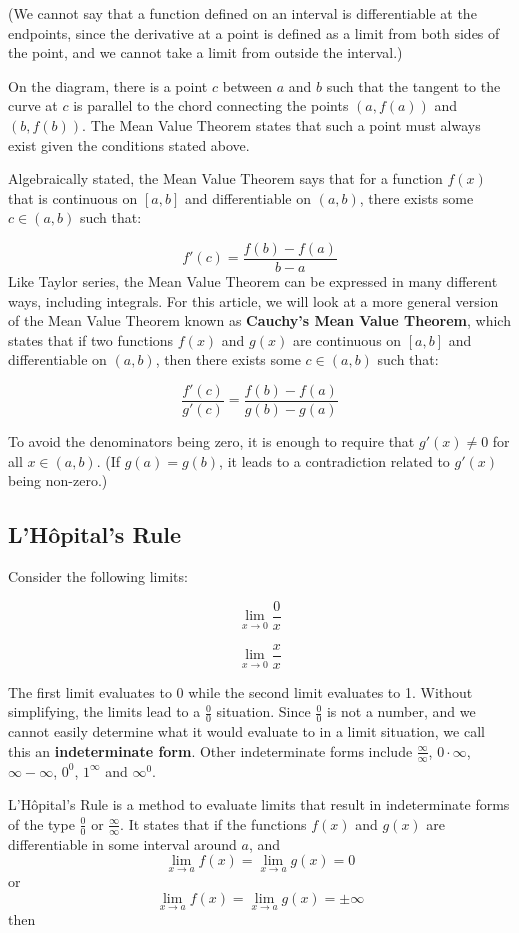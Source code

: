 \documentclass{article}
\begin{document}
(We cannot say that a function defined on an interval is differentiable at the endpoints, since the derivative at a point is defined as a limit from both sides of the point, and we cannot take a limit from outside the interval.)

On the diagram, there is a point $c$ between $a$ and $b$ such that the tangent to the curve at $c$ is parallel to the chord connecting the points $(a, f(a))$ and $(b, f(b))$. The Mean Value Theorem states that such a point must always exist given the conditions stated above.

Algebraically stated, the Mean Value Theorem says that for a function $f(x)$ that is continuous on $[a, b]$ and differentiable on $(a, b)$, there exists some $c \in (a, b)$ such that:

$$f'(c) = \frac{f(b) - f(a)}{b - a}$$
Like Taylor series, the Mean Value Theorem can be expressed in many different ways, including integrals. For this article, we will look at a more general version of the Mean Value Theorem known as \textbf{Cauchy's Mean Value Theorem}, which states that if two functions $f(x)$ and $g(x)$ are continuous on $[a, b]$ and differentiable on $(a, b)$, then there exists some $c \in (a, b)$ such that:

$$\frac{f'(c)}{g'(c)} = \frac{f(b) - f(a)}{g(b) - g(a)}$$

To avoid the denominators being zero, it is enough to require that $g'(x) \neq 0$ for all $x \in (a, b)$. (If $g(a)=g(b)$, it leads to a contradiction related to $g'(x)$ being non-zero.)

\subsection*{L'Hôpital's Rule}

Consider the following limits:

$$
\lim_{x \to 0} \frac{0}{x}
$$

$$
\lim_{x \to 0} \frac{x}{x}
$$

The first limit evaluates to 0 while the second limit evaluates to 1. Without simplifying, the limits lead to a $\frac{0}{0}$ situation. Since $\frac{0}{0}$ is not a number, and we cannot easily determine what it would evaluate to in a limit situation, we call this an \textbf{indeterminate form}. Other indeterminate forms include $\frac{\infty}{\infty}$, $0 \cdot \infty$, $\infty - \infty$, $0^0$, $1^\infty$ and $\infty^0$.

L'Hôpital's Rule is a method to evaluate limits that result in indeterminate forms of the type $\frac{0}{0}$ or $\frac{\infty}{\infty}$. It states that if the functions $f(x)$ and $g(x)$ are differentiable in some interval around $a$, and $$\lim_{x \to a} f(x) = \lim_{x \to a} g(x) = 0$$ or $$\lim_{x \to a} f(x) = \lim_{x \to a} g(x) = \pm \infty$$ then
\end{document}
